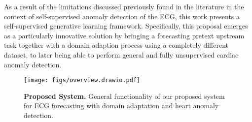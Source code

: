 As a result of the limitations discussed previously found in the literature in the context of self-supervised anomaly detection of the ECG, this work presents a self-supervised generative learning framework. Specifically, this proposal emerges as a particularly innovative solution by bringing a forecasting pretext upstream task together with a domain adaption process using a completely different dataset, to later being able to perform general and fully unsupervised cardiac anomaly detection.


\begin{figure*}[tbh]
\centering
\texttt{[image: figs/overview.drawio.pdf]}
\caption{\textbf{Proposed System.} General functionality of our proposed system for ECG forecasting with domain adaptation and heart anomaly detection.}
\label{fig:system}
\end{figure*}